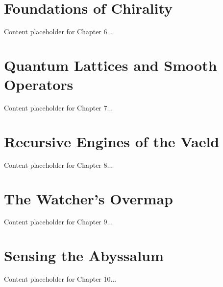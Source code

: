 
\chapter{Foundations of Chirality}
Content placeholder for Chapter 6...

\chapter{Quantum Lattices and Smooth Operators}
Content placeholder for Chapter 7...

\chapter{Recursive Engines of the Vaeld}
Content placeholder for Chapter 8...

\chapter{The Watcher’s Overmap}
Content placeholder for Chapter 9...

\chapter{Sensing the Abyssalum}
Content placeholder for Chapter 10...
